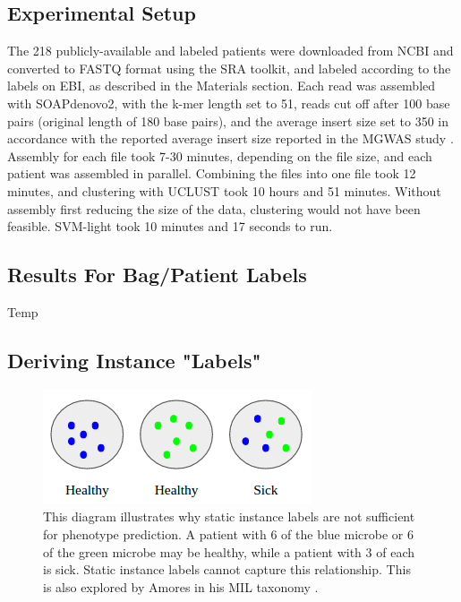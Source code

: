 
\subsection{Experimental Setup}

The 218 publicly-available and labeled patients were downloaded from NCBI and converted to FASTQ format using the SRA toolkit, and labeled according to the labels on EBI, as described in the Materials section. Each read was assembled with SOAPdenovo2, with the k-mer length set to 51, reads cut off after 100 base pairs (original length of 180 base pairs), and the average insert size set to 350 in accordance with the reported average insert size reported in the MGWAS study \cite{qin041012}. Assembly for each file took 7-30 minutes, depending on the file size, and each patient was assembled in parallel. Combining the files into one file took 12 minutes, and clustering with UCLUST took 10 hours and 51 minutes. Without assembly first reducing the size of the data, clustering would not have been feasible. SVM-light took 10 minutes and 17 seconds to run.

\subsection{Results For Bag/Patient Labels}

Temp

\subsection{Deriving Instance "Labels"}

\begin{figure}[t]
\centering
\includegraphics[scale=0.5]{./instance-labels.png}
\caption{This diagram illustrates why static instance labels are not sufficient for phenotype prediction. A patient with 6 of the blue microbe or 6 of the green microbe may be healthy, while a patient with 3 of each is sick. Static instance labels cannot capture this relationship. This is also explored by Amores in his MIL taxonomy \cite{amores13}.} \label{instance-labels}
\end{figure}

